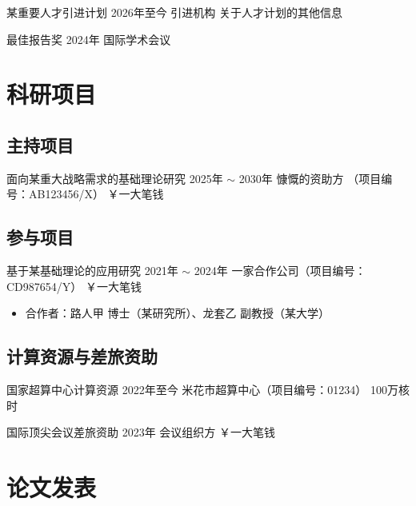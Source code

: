 \documentclass[a4paper,11pt]{article}
\begin{document}
\award
	{某重要人才引进计划}
	{2026年至今}
	{引进机构}
	{关于人才计划的其他信息}

\award
	{最佳报告奖}
	{2024年}
	{国际学术会议}{}


\section{科研项目}

\subsection{主持项目}


\grant
	{面向某重大战略需求的基础理论研究}
	{2025年 $\sim$ 2030年}
	{慷慨的资助方 （项目编号：AB123456/X）}
	{￥一大笔钱}{}

\subsection{参与项目}

\grant
	{基于某基础理论的应用研究}
	{2021年 $\sim$ 2024年}
	{一家合作公司（项目编号：CD987654/Y）}
	{￥一大笔钱}
	{\begin{itemize}
		\item[-] 合作者：路人甲 博士（某研究所）、龙套乙 副教授（某大学）
	\end{itemize}}

\subsection{计算资源与差旅资助}

\grant
	{国家超算中心计算资源}
	{2022年至今}
	{米花市超算中心（项目编号：01234）}
	{100万核时}{}

\grant
	{国际顶尖会议差旅资助}
	{2023年}
	{会议组织方}
	{￥一大笔钱}{}


\section{论文发表}
\end{document}
